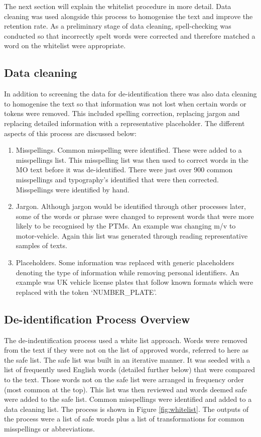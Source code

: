 The next section will explain the whitelist procedure in more detail. Data cleaning was used alongside this process to homogenise the text and improve the retention rate. As a preliminary stage of data cleaning, spell-checking was conducted so that incorrectly spelt words were corrected and therefore matched a word on the whitelist were appropriate. 

\subsection{Data cleaning} In addition to screening the data for de-identification there was also data cleaning to homogenise the text so that information was not lost when certain words or tokens were removed. This included spelling correction, replacing jargon and replacing detailed information with a representative placeholder. The different aspects of this process are discussed below:

\begin{enumerate}
    \item{Misspellings.} Common misspelling were identified. These were added to a misspellings list. This misspelling list was then used to correct words in the MO text before it was de-identified. There were just over 900 common misspellings and typography's identified that were then corrected. Misspellings were identified by hand.
    
    \item{Jargon.} Although jargon would be identified through other processes later, some of the words or phrase were changed to represent words that were more likely to be recognised by the PTMs. An example was changing m/v to motor-vehicle. Again this list was generated through reading representative samples of texts.
    
    \item{Placeholders.} Some information was replaced with generic placeholders denoting the type of information while removing personal identifiers. An example was UK vehicle license plates that follow known formats which were replaced with the token ‘NUMBER\_PLATE’. 
\end{enumerate}


\subsection{De-identification Process Overview} The de-indentification process  used a white list approach. Words were removed from the text if they were not on the list of approved words, referred to here as the safe list. The safe list was built in an iterative manner.  It was seeded with  a list of  frequently used English words (detailed further below) that were compared to the text. Those words not on the safe list were arranged in frequency order (most common at the top). This list was then reviewed and words deemed safe were added to the safe list. Common misspellings were identified and added to a data cleaning list. The process is shown in Figure \ref{fig:whitelist}. The outputs of the process  were a list of safe words plus a list of transformations for common misspellings or abbreviations.



